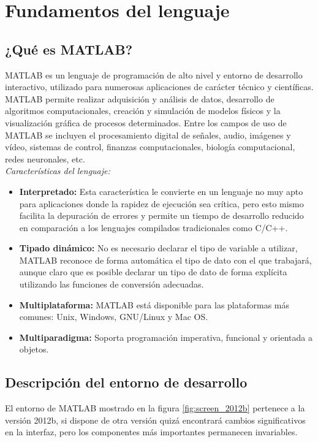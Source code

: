 \chapter{Fundamentos del lenguaje}
 
\section{¿Qué es MATLAB?}

MATLAB es un lenguaje de programación de alto nivel y entorno de
desarrollo interactivo, utilizado para numerosas aplicaciones de
carácter técnico y científicas. MATLAB permite realizar adquisición y
análisis de datos, desarrollo de algoritmos computacionales, creación y 
simulación de modelos físicos y la visualización gráfica de procesos 
determinados. Entre los campos de uso de MATLAB se incluyen el
procesamiento digital de señales, audio, imágenes y vídeo, sistemas de
control, finanzas computacionales, biología computacional, redes
neuronales, etc. \\

\emph{Características del lenguaje:} 

\begin{itemize}
\item
  \textbf{Interpretado:} Esta característica le convierte en un lenguaje no muy
  apto para aplicaciones donde la rapidez de ejecución sea crítica, pero
  esto mismo facilita la depuración de errores y permite un tiempo de
  desarrollo reducido en comparación a los lenguajes compilados
  tradicionales como C/C++.
\item
  \textbf{Tipado dinámico:} No es necesario declarar el tipo de variable a
  utilizar, MATLAB reconoce de forma automática el tipo de dato con el
  que trabajará, aunque claro que es posible declarar un tipo de dato de
  forma explícita utilizando las funciones de conversión adecuadas.
\item
  \textbf{Multiplataforma:} MATLAB está disponible para las plataformas más
  comunes: Unix, Windows, GNU/Linux y Mac OS.
\item
  \textbf{Multiparadigma:} Soporta programación imperativa, funcional y orientada
  a objetos.
\end{itemize}

\section{Descripción del entorno de desarrollo}

El entorno de MATLAB mostrado en la figura \ref{fig:screen_2012b}
pertenece a la versión 2012b, si dispone de otra versión quizá
encontrará cambios significativos en la interfaz, pero los componentes
más importantes permanecen invariables. \\

